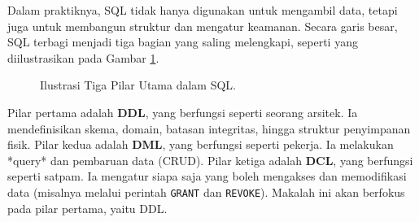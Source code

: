\documentclass[11pt,a4paper]{article}
\begin{document}
Dalam praktiknya, SQL tidak hanya digunakan untuk mengambil data, tetapi juga untuk membangun struktur dan mengatur keamanan. Secara garis besar, SQL terbagi menjadi tiga bagian yang saling melengkapi, seperti yang diilustrasikan pada Gambar \ref{fig:sql_parts}.

\begin{figure}[H]
	\centering
	\caption{Ilustrasi Tiga Pilar Utama dalam SQL.}
	\label{fig:sql_parts}
\end{figure}

Pilar pertama adalah \textbf{DDL}, yang berfungsi seperti seorang arsitek. Ia mendefinisikan skema, domain, batasan integritas, hingga struktur penyimpanan fisik. Pilar kedua adalah \textbf{DML}, yang berfungsi seperti pekerja. Ia melakukan *query* dan pembaruan data (CRUD). Pilar ketiga adalah \textbf{DCL}, yang berfungsi seperti satpam. Ia mengatur siapa saja yang boleh mengakses dan memodifikasi data (misalnya melalui perintah \texttt{GRANT} dan \texttt{REVOKE}). Makalah ini akan berfokus pada pilar pertama, yaitu DDL.
\end{document}
